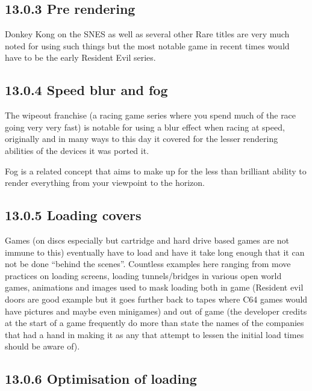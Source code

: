 \documentclass[
]{book}
\begin{document}
\hypertarget{pre-rendering}{%
\subsection{13.0.3 Pre rendering}\label{pre-rendering}}

Donkey Kong on the SNES as well as several other Rare titles are very much noted for using such things but the most notable game in recent times would have to be the early Resident Evil series.

\hypertarget{speed-blur-and-fog}{%
\subsection{13.0.4 Speed blur and fog}\label{speed-blur-and-fog}}

The wipeout franchise (a racing game series where you spend much of the race going very very fast) is notable for using a blur effect when racing at speed, originally and in many ways to this day it covered for the lesser rendering abilities of the devices it was ported it.

Fog is a related concept that aims to make up for the less than brilliant ability to render everything from your viewpoint to the horizon.

\hypertarget{loading-covers}{%
\subsection{13.0.5 Loading covers}\label{loading-covers}}

Games (on discs especially but cartridge and hard drive based games are not immune to this) eventually have to load and have it take long enough that it can not be done ``behind the scenes''. Countless examples here ranging from move practices on loading screens, loading tunnels/bridges in various open world games, animations and images used to mask loading both in game (Resident evil doors are good example but it goes further back to tapes where C64 games would have pictures and maybe even minigames) and out of game (the developer credits at the start of a game frequently do more than state the names of the companies that had a hand in making it as any that attempt to lessen the initial load times should be aware of).

\hypertarget{optimisation-of-loading}{%
\subsection{13.0.6 Optimisation of loading}\label{optimisation-of-loading}}
\end{document}
